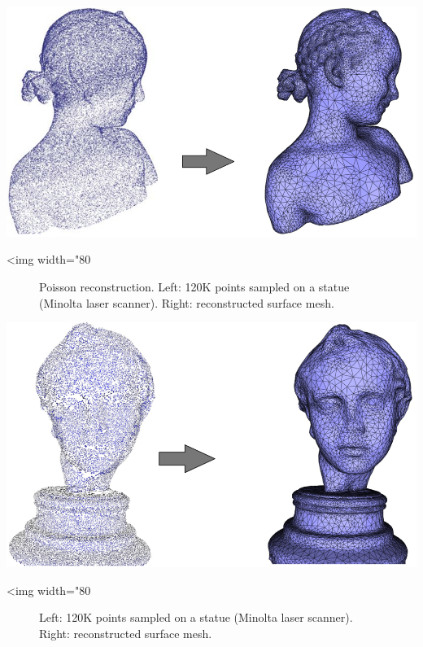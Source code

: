 \begin{center}
    \label{Surface_reconstruction_points_3-fig-bimba}
    \begin{ccTexOnly}
  \includegraphics[width=1.0\textwidth]{Surface_reconstruction_points_3/bimba}
    \end{ccTexOnly}
    \begin{ccHtmlOnly}
        <img width="80%
    \end{ccHtmlOnly}
    \begin{figure}[h]
        \caption{Poisson reconstruction.
                 Left: 120K points sampled on a statue (Minolta laser scanner).
                 Right: reconstructed surface mesh.}
    \end{figure}
\end{center}

\begin{center}
    \label{Surface_reconstruction_points_3-fig-eros}
    \begin{ccTexOnly}
\includegraphics[width=1.0\textwidth]{Surface_reconstruction_points_3/eros}
    \end{ccTexOnly}
    \begin{ccHtmlOnly}
        <img width="80%
    \end{ccHtmlOnly}
    \begin{figure}[h]
        \caption{Left: 120K points sampled on a statue (Minolta laser scanner).
                 Right: reconstructed surface mesh.}
    \end{figure}
\end{center}

